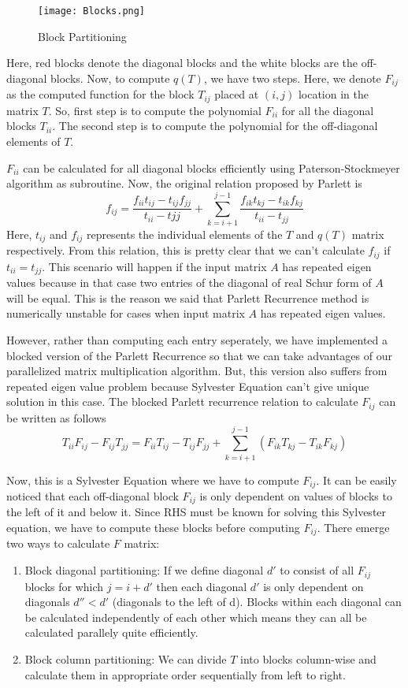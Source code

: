 \documentclass[12pt,a4paper]{article}
\begin{document}
\begin{figure}
    \centering
    \texttt{[image: Blocks.png]}
    \caption{Block Partitioning}
\end{figure}

Here, red blocks denote the diagonal blocks and the white blocks are the off-diagonal blocks. Now, to compute $q(T)$, we have two steps. Here, we denote $F_{ij}$ as the computed function for the block $T_{ij}$ placed at $(i, j)$ location in the matrix $T$. So, first step is to compute the polynomial $F_{ii}$ for all the diagonal blocks $T_{ii}$. The second step is to compute the polynomial for the off-diagonal elements of $T$.

$F_{ii}$ can be calculated for all diagonal blocks efficiently using Paterson-Stockmeyer algorithm as subroutine. Now, the original relation proposed by Parlett is
$$f_{ij} = \frac{f_{ii}t_{ij} - t_{ij}f_{jj}}{t_{ii} - t{jj}} + \sum_{k=i+1}^{j-1}\frac{f_{ik}t_{kj} - t_{ik}f_{kj}}{t_{ii} - t_{jj}}$$
Here, $t_{ij}$ and $f_{ij}$ represents the individual elements of the $T$ and $q(T)$ matrix respectively. From this relation, this is pretty clear that we can't calculate $f_{ij}$ if $t_{ii} = t_{jj}$. This scenario will happen if the input matrix $A$ has repeated eigen values because in that case two entries of the diagonal of real Schur form of $A$ will be equal. This is the reason we said that Parlett Recurrence method is numerically unstable for cases when input matrix $A$ has repeated eigen values.

However, rather than computing each entry seperately, we have implemented a blocked version of the Parlett Recurrence so that we can take advantages of our parallelized matrix multiplication algorithm. But, this version also suffers from repeated eigen value problem because Sylvester Equation can't give unique solution in this case. 
\newpage
The blocked Parlett recurrence relation to calculate $F_{ij}$ can be written as follows 
$$T_{ii}F_{ij} - F_{ij}T_{jj} = F_{ii}T_{ij} - T_{ij}F_{jj} + \sum_{k=i+1}^{j-1}(F_{ik}T_{kj} - T_{ik}F_{kj})$$ 

 Now, this is a Sylvester Equation where we have to compute $F_{ij}$. It can be easily noticed that each off-diagonal block $F_{ij}$ is only dependent on values of blocks to the left of it and below it. Since RHS must be known for solving this Sylvester equation, we have to compute these blocks before computing $F_{ij}$. There emerge two ways to calculate $F$ matrix:
\begin{enumerate}
    \item Block diagonal partitioning: If we define diagonal $d'$ to consist of all $F_{ij}$ blocks for which $j = i + d'$ then each diagonal $d'$ is only dependent on diagonals $d''<d'$ (diagonals to the left of d). Blocks within each diagonal can be calculated independently of each other which means they can all be calculated parallely quite efficiently.  
    \vspace{0.5cm}
    \item Block column partitioning: We can divide $T$ into blocks column-wise and calculate them in appropriate order sequentially from left to right. 
\end{enumerate}
\end{document}
